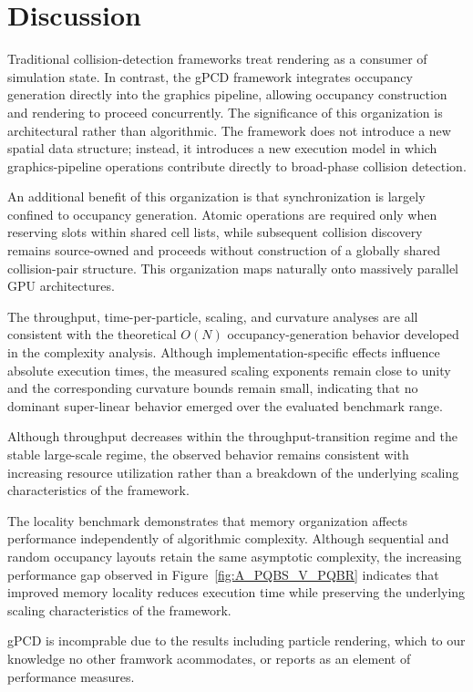 \section{Discussion}

Traditional collision-detection frameworks treat rendering as a
consumer of simulation state. In contrast, the gPCD framework
integrates occupancy generation directly into the graphics pipeline,
allowing occupancy construction and rendering to proceed concurrently.
The significance of this organization is architectural rather than
algorithmic. The framework does not introduce a new spatial data
structure; instead, it introduces a new execution model in which
graphics-pipeline operations contribute directly to broad-phase
collision detection.

An additional benefit of this organization is that synchronization is
largely confined to occupancy generation. Atomic operations are
required only when reserving slots within shared cell lists, while
subsequent collision discovery remains source-owned and proceeds
without construction of a globally shared collision-pair structure.
This organization maps naturally onto massively parallel GPU
architectures.

The throughput, time-per-particle, scaling, and curvature analyses are
all consistent with the theoretical \(O(N)\) occupancy-generation
behavior developed in the complexity analysis. Although
implementation-specific effects influence absolute execution times, the
measured scaling exponents remain close to unity and the corresponding
curvature bounds remain small, indicating that no dominant super-linear
behavior emerged over the evaluated benchmark range.

Although throughput decreases within the throughput-transition regime
and the stable large-scale regime, the observed behavior remains
consistent with increasing resource utilization rather than a breakdown
of the underlying scaling characteristics of the framework.

The locality benchmark demonstrates that memory organization affects
performance independently of algorithmic complexity. Although
sequential and random occupancy layouts retain the same asymptotic
complexity, the increasing performance gap observed in
Figure~\ref{fig:A_PQBS_V_PQBR} indicates that improved memory locality
reduces execution time while preserving the underlying scaling
characteristics of the framework.

gPCD is incomprable due to the results including particle rendering, which to our knowledge no other framwork acommodates, or reports as an element of performance measures.

